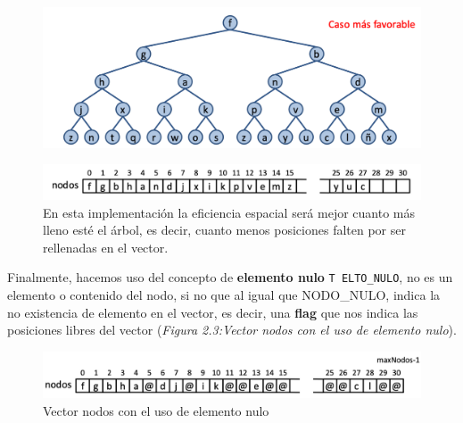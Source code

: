 \begin{figure}[h]
  \begin{minipage}{0.39\textwidth}
    \includegraphics[width=\textwidth]{assets/IVPR5.png}
  \end{minipage}
  \hfill
  \begin{minipage}{0.6\textwidth}
    \includegraphics*[width=\textwidth]{assets/IVPR6.png}
    En esta implementación la eficiencia espacial será mejor cuanto más lleno esté el árbol, es decir, cuanto menos posiciones falten por ser rellenadas en el vector.
  \end{minipage}
\end{figure}

Finalmente, hacemos uso del concepto de \textbf{elemento nulo} \texttt{T ELTO\_NULO}, no es un elemento o contenido del nodo, si no que al igual que NODO\_NULO, indica la no existencia de elemento en el vector, es decir, una \textbf{flag} que nos indica las posiciones libres del vector (\textit{Figura 2.3:Vector nodos con el uso de elemento nulo}).
\begin{figure}[h]
  \begin{center}
    \includegraphics*[width=\textwidth]{assets/IVPR7.png}
  \end{center}
  \caption{Vector nodos con el uso de elemento nulo}
\end{figure}